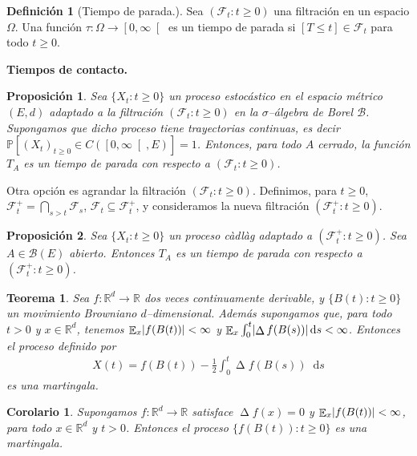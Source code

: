 \documentclass{article}
\newcommand{\cadlag}{càdlàg}
\newcommand{\prob}{\mathbb{P}}
\newcommand{\events}{\mathcal{F}}
\newcommand{\eventspp}{\events^+}
\newcommand{\borel}{\mathcal{B}}
\newcommand{\brownian}{B}
\newcommand{\dd}{\mathop{}\!\mathrm{d}}
\newcommand{\realNumbers}{\mathbb{R}}
\DeclareMathOperator{\laplacian}{\Delta}
\DeclareMathOperator{\Expectation}{\mathbb{E}}
\DeclarePairedDelimiter{\abs}{\lvert}{\rvert}
\theoremstyle{plain}
\newtheorem{theorem}{Teorema}
\newtheorem{proposition}{Proposición}
\newtheorem{corollary}{Corolario}
\theoremstyle{remark}
\theoremstyle{definition}
\newtheorem{definition}{Definición}
\begin{document}
\begin{definition}[Tiempo de parada.]
Sea \((\events_t : t \geq 0)\) una filtración en un espacio \(\Omega\).
Una función \(\tau : \Omega \rightarrow \left[ 0, \infty \right[\) es un tiempo de parada si \([T \leq t] \in \events_t\) para todo \(t \geq 0\).
\end{definition}

\textbf{Tiempos de contacto.}

\begin{proposition}
  Sea \(\{X_t : t \geq 0\}\) un proceso estocástico en el espacio métrico \((E, d)\) adaptado a la filtración \((\events_t : t \geq 0)\) en la \(\sigma\)--álgebra de Borel \(\borel\).
  Supongamos que dicho proceso tiene trayectorias continuas, es decir \(\prob[ (X_t)_{t \geq 0} \in C(\left[0, \infty \right[, E)] = 1\).
  Entonces, para todo \(A\) cerrado, la función \(T_A\) es un tiempo de parada con respecto a \((\events_t : t \geq 0)\).
\end{proposition}

Otra opción es agrandar la filtración \((\events_t : t \geq 0)\).
Definimos, para \(t \geq 0\), \(\eventspp_t = \bigcap_{s > t} \events_s\), \(\events_t \subseteq \eventspp_t\), y consideramos la nueva filtración \((\eventspp_t : t \geq 0)\).
\begin{proposition}
  Sea \(\{X_t : t \geq 0\}\) un proceso \cadlag{} adaptado a \((\eventspp_t : t \geq 0)\).
  Sea \(A \in \borel(E)\) abierto.
  Entonces \(T_A\) es un tiempo de parada con respecto a \((\eventspp_t : t \geq 0)\).
\end{proposition}


\begin{theorem}
  Sea \(f : \realNumbers^d \rightarrow \realNumbers\) dos veces continuamente derivable, y \(\{\brownian(t) : t \geq 0\}\) un movimiento Browniano \(d\)--dimensional.
  Además supongamos que, para todo \(t > 0\) y \(x \in \realNumbers^d\), tenemos \(\Expectation_x \abs{f(\brownian(t))} < \infty\) y \(\Expectation_x \int_0^t \abs{\laplacian f(\brownian(s))} \dd s < \infty\).
  Entonces el proceso definido por
  \begin{align}
    X(t)
    =
    f(\brownian(t)) - \frac{1}{2} \int_0^t \laplacian f(\brownian(s)) \dd s
  \end{align}
  es una martingala.
\end{theorem}
\begin{corollary}
  Supongamos \(f : \realNumbers^d \rightarrow \realNumbers\) satisface \(\laplacian f(x) = 0\) y \(\Expectation_x \abs{f(\brownian(t))} < \infty\), para todo \(x \in \realNumbers^d\) y \(t > 0\).
  Entonces el proceso \(\{f(\brownian(t)) : t \geq 0\}\) es una martingala.
\end{corollary}
\end{document}

